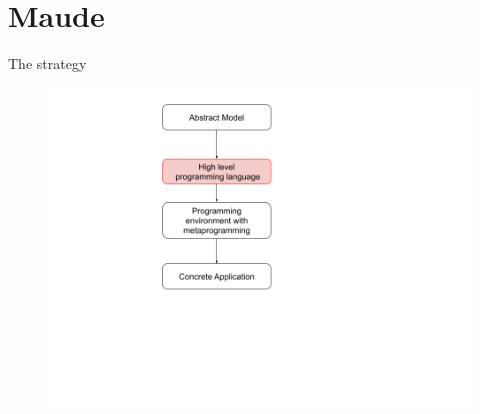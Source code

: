 \documentclass{beamer}
\begin{document}
\section{Maude}
\begin{frame}{The strategy}
    \begin{figure}
        \includegraphics[height=\textheight]{img/sec2.png}
    \end{figure}
\end{frame}
\end{document}
